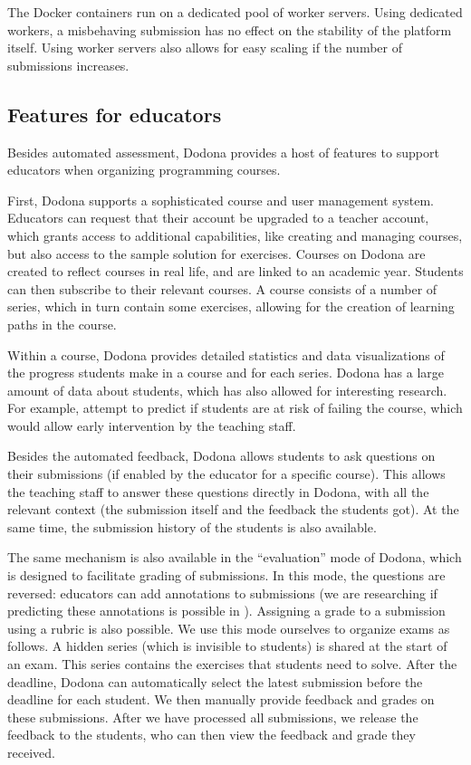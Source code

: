 \documentclass[../main]{subfiles}
\begin{document}
The Docker containers run on a dedicated pool of worker servers.
Using dedicated workers, a misbehaving submission has no effect on the stability of the platform itself.
Using worker servers also allows for easy scaling if the number of submissions increases.

\subsection{Features for educators}\label{subsec:features-for-educators}

Besides automated assessment, Dodona provides a host of features to support educators when organizing programming courses.

First, Dodona supports a sophisticated course and user management system.
Educators can request that their account be upgraded to a teacher account, which grants access to additional capabilities, like creating and managing courses, but also access to the sample solution for exercises.
Courses on Dodona are created to reflect courses in real life, and are linked to an academic year.
Students can then subscribe to their relevant courses.
A course consists of a number of series, which in turn contain some exercises, allowing for the creation of learning paths in the course.

Within a course, Dodona provides detailed statistics and data visualizations of the progress students make in a course and for each series.
Dodona has a large amount of data about students, which has also allowed for interesting research.
For example, \textcite{vanpetegemPassFailPrediction2023} attempt to predict if students are at risk of failing the course, which would allow early intervention by the teaching staff.

Besides the automated feedback, Dodona allows students to ask questions on their submissions (if enabled by the educator for a specific course).
This allows the teaching staff to answer these questions directly in Dodona, with all the relevant context (the submission itself and the feedback the students got).
At the same time, the submission history of the students is also available.

The same mechanism is also available in the ``evaluation'' mode of Dodona, which is designed to facilitate grading of submissions.
In this mode, the questions are reversed: educators can add annotations to submissions (we are researching if predicting these annotations is possible in \textcite{vanpetegemMiningPatternsSyntax2024}).
Assigning a grade to a submission using a rubric is also possible.
We use this mode ourselves to organize exams as follows.
A hidden series (which is invisible to students) is shared at the start of an exam.
This series contains the exercises that students need to solve.
After the deadline, Dodona can automatically select the latest submission before the deadline for each student.
We then manually provide feedback and grades on these submissions.
After we have processed all submissions, we release the feedback to the students, who can then view the feedback and grade they received.
\end{document}
